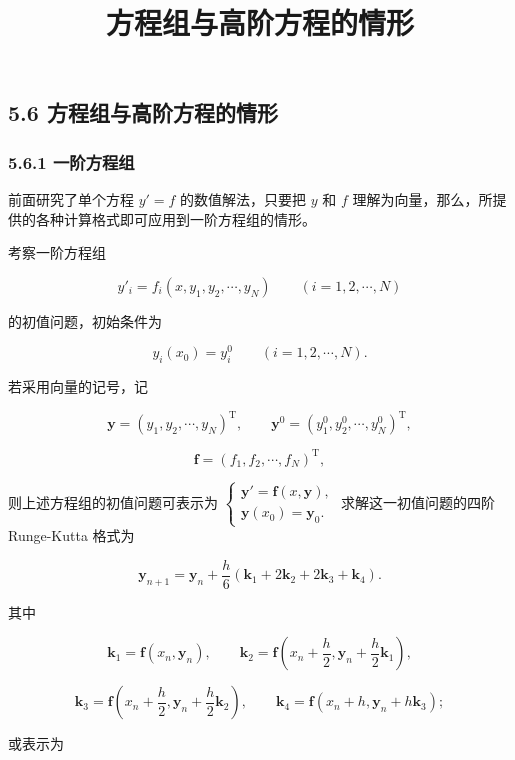\documentclass[
  10pt,
  fontset=fandol]{ctexart}
\title{方程组与高阶方程的情形}
\author{}
\date{}
\begin{document}
\maketitle

\subsection{5.6 方程组与高阶方程的情形}\label{ux65b9ux7a0bux7ec4ux4e0eux9ad8ux9636ux65b9ux7a0bux7684ux60c5ux5f62}

\subsubsection{5.6.1 一阶方程组}\label{ux4e00ux9636ux65b9ux7a0bux7ec4}

前面研究了单个方程 \(y'=f\) 的数值解法，只要把 \(y\) 和 \(f\) 理解为向量，那么，所提供的各种计算格式即可应用到一阶方程组的情形。

考察一阶方程组

\[
y'_i=f_i(x,y_1,y_2,\cdots,y_N)\qquad(i=1,2,\cdots,N)
\]

的初值问题，初始条件为

\[
y_i(x_0)=y_i^0\qquad(i=1,2,\cdots,N).
\]

若采用向量的记号，记

\[
\boldsymbol y=(y_1,y_2,\cdots,y_N)^{\mathrm T},\qquad
\boldsymbol y^0=(y_1^0,y_2^0,\cdots,y_N^0)^{\mathrm T},
\]

\[
\boldsymbol f=(f_1,f_2,\cdots,f_N)^{\mathrm T},
\]

则上述方程组的初值问题可表示为 \(\begin{cases}\boldsymbol y'=\boldsymbol f(x,\boldsymbol y),\\\boldsymbol y(x_0)=\boldsymbol y_0.\end{cases}\) 求解这一初值问题的四阶 Runge-Kutta 格式为

\[
\boldsymbol y_{n+1}=\boldsymbol y_n+\frac h6(\boldsymbol k_1+2\boldsymbol k_2+2\boldsymbol k_3+\boldsymbol k_4).
\]

其中

\[
\boldsymbol k_1=\boldsymbol f(x_n,\boldsymbol y_n),\qquad
\boldsymbol k_2=\boldsymbol f\left(x_n+\frac h2,\boldsymbol y_n+\frac h2\boldsymbol k_1\right),
\]

\[
\boldsymbol k_3=\boldsymbol f\left(x_n+\frac h2,\boldsymbol y_n+\frac h2\boldsymbol k_2\right),\qquad
\boldsymbol k_4=\boldsymbol f(x_n+h,\boldsymbol y_n+h\boldsymbol k_3);
\]

或表示为
\end{document}
